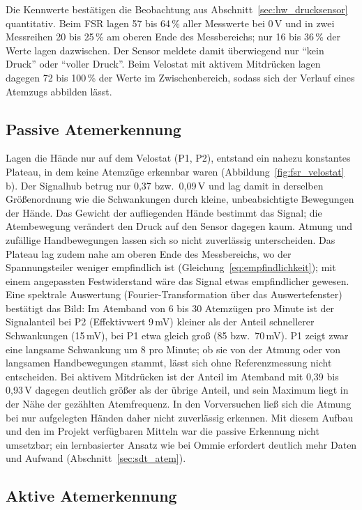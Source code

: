 Die Kennwerte bestätigen die Beobachtung aus Abschnitt~\ref{sec:hw_drucksensor} quantitativ. Beim
\ac{FSR} lagen 57 bis 64\,\% aller Messwerte bei 0\,V und in zwei Messreihen 20 bis 25\,\% am oberen
Ende des Messbereichs; nur 16 bis 36\,\% der Werte lagen dazwischen. Der Sensor meldete damit
überwiegend nur \enquote{kein Druck} oder \enquote{voller Druck}. Beim Velostat mit aktivem
Mitdrücken lagen dagegen 72 bis 100\,\% der Werte im Zwischenbereich, sodass sich der Verlauf
eines Atemzugs abbilden lässt.

\subsection{Passive Atemerkennung}
\label{sec:erg_passiv}

Lagen die Hände nur auf dem Velostat (P1, P2), entstand ein nahezu konstantes Plateau, in dem
keine Atemzüge erkennbar waren (Abbildung~\ref{fig:fsr_velostat}\,b). Der Signalhub betrug nur
0{,}37 bzw.\ 0{,}09\,V und lag damit in derselben Größenordnung wie die Schwankungen durch
kleine, unbeabsichtigte Bewegungen der Hände. Das Gewicht der aufliegenden Hände bestimmt das
Signal; die Atembewegung verändert den Druck auf den Sensor dagegen kaum. Atmung und zufällige
Handbewegungen lassen sich so nicht zuverlässig unterscheiden. Das Plateau lag zudem nahe am
oberen Ende des Messbereichs, wo der Spannungsteiler weniger empfindlich ist
(Gleichung~\ref{eq:empfindlichkeit}); mit einem angepassten Festwiderstand wäre das Signal etwas
empfindlicher gewesen. Eine spektrale Auswertung (Fourier-Transformation über das Auswertefenster)
bestätigt das Bild: Im Atemband von 6 bis 30 Atemzügen pro Minute ist der Signalanteil bei P2
(Effektivwert 9\,mV) kleiner als der Anteil schnellerer Schwankungen (15\,mV), bei P1
etwa gleich groß (85 bzw.\ 70\,mV). P1 zeigt zwar eine langsame Schwankung um 8 pro Minute; ob sie
von der Atmung oder von langsamen Handbewegungen stammt, lässt sich ohne Referenzmessung nicht
entscheiden. Bei aktivem Mitdrücken ist der Anteil im Atemband mit 0{,}39 bis 0{,}93\,V
dagegen deutlich größer als der übrige Anteil, und sein Maximum liegt in der Nähe der gezählten
Atemfrequenz. In den Vorversuchen ließ sich die Atmung bei nur aufgelegten Händen daher nicht
zuverlässig erkennen. Mit diesem Aufbau und den im Projekt verfügbaren Mitteln war die passive
Erkennung nicht umsetzbar; ein lernbasierter Ansatz wie bei Ommie erfordert deutlich mehr Daten und
Aufwand (Abschnitt~\ref{sec:sdt_atem}).

\subsection{Aktive Atemerkennung}
\label{sec:erg_aktiv}

